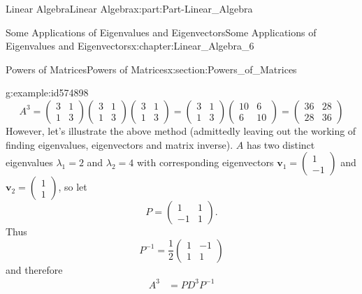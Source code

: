 \documentclass[oneside,10pt,]{book}
\numberwithin{equation}{section}
\newcommand{\bm}[1]{\boldsymbol{#1}}
\newcommand{\amp}{&}
\begin{document}
\begin{partptx}{Linear Algebra}{}{Linear Algebra}{}{}{x:part:Part-Linear_Algebra}
\begin{chapterptx}{Some Applications of Eigenvalues and Eigenvectors}{}{Some Applications of Eigenvalues and Eigenvectors}{}{}{x:chapter:Linear_Algebra_6}
\begin{sectionptx}{Powers of Matrices}{}{Powers of Matrices}{}{}{x:section:Powers_of_Matrices}
\begin{example}{}{g:example:id574898}
\begin{equation*}
A^3 = \begin{pmatrix} 3 \amp 1 \\ 1 \amp 3 \end{pmatrix} \begin{pmatrix} 3 \amp 1 \\ 1 \amp 3 \end{pmatrix} \begin{pmatrix} 3 \amp 1 \\ 1 \amp 3 \end{pmatrix} = \begin{pmatrix} 3 \amp 1 \\ 1 \amp 3 \end{pmatrix} \begin{pmatrix} 10 \amp 6 \\ 6 \amp 10 \end{pmatrix} = \begin{pmatrix} 36 \amp 28 \\ 28 \amp 36 \end{pmatrix}
\end{equation*}
However,  let’s  illustrate  the  above  method  (admittedly  leaving  out  the  working  of finding  eigenvalues,  eigenvectors  and  matrix  inverse).  \(A\)  has  two  distinct  eigenvalues \(\lambda_1 = 2\) and \(\lambda_2 = 4\) with corresponding eigenvectors \(\bm{v}_1 = \begin{pmatrix} 1 \\ -1 \end{pmatrix}\) and \(\bm{v}_2 = \begin{pmatrix} 1 \\ 1 \end{pmatrix}\), so let%
\begin{equation*}
P = \begin{pmatrix} 1 \amp 1 \\ -1 \amp 1 \end{pmatrix}\text{.}
\end{equation*}
Thus%
\begin{equation*}
P^{-1} = \dfrac{1}{2} \begin{pmatrix} 1 \amp -1 \\ 1 \amp 1 \end{pmatrix}
\end{equation*}
and therefore%
\begin{align*}
A^3 \amp = PD^3 P^{-1}\\

\end{align*}
\end{example}
\end{sectionptx}
\end{chapterptx}
\end{partptx}
\end{document}
